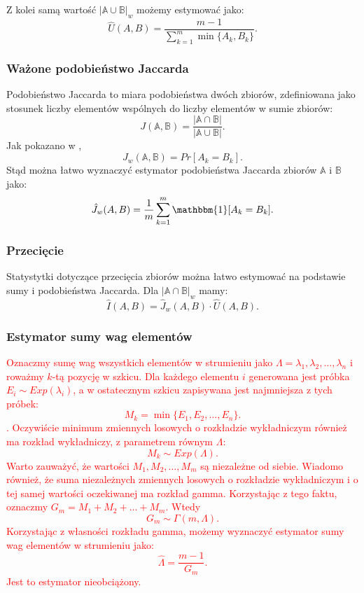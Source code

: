     Z kolei samą wartość $|\mathbb{A} \cup \mathbb{B}|_{w}$ możemy estymować jako:
    \[
        \hat{U}(A, B) = \frac{m - 1}{\sum\limits_{k = 1}^{m} \min{\{A_k, B_k\}}} .
    \]

    \subsubsection*{Ważone podobieństwo Jaccarda} 
    Podobieństwo Jaccarda to miara podobieństwa dwóch zbiorów, zdefiniowana jako stosunek liczby elementów wspólnych do liczby elementów w sumie zbiorów:
    \[
        J(\mathbb{A}, \mathbb{B}) = \frac{|\mathbb{A} \cap \mathbb{B}|}{|\mathbb{A} \cup \mathbb{B}|}.
    \]
    Jak pokazano w \cite{Lemiesz_2021}, 
    \[
        J_w(\mathbb{A}, \mathbb{B}) = Pr[A_k = B_k]. 
    \]
    Stąd można łatwo wyznaczyć estymator podobieństwa Jaccarda zbiorów $\mathbb{A}$ i $\mathbb{B}$ jako:
    \[
        \hat{J}_w(A, B) = \frac{1}{m} \sum\limits_{k = 1}^{m} \mathbbm{1}[A_k = B_k].  
    \]

    \subsubsection*{Przecięcie}
    Statystytki dotyczące przecięcia zbiorów można łatwo estymować na podstawie sumy i podobieństwa Jaccarda. Dla $|\mathbb{A} \cap \mathbb{B}|_{w}$ mamy:
    \[
        \hat{I}(A, B) = \hat{J}_w(A, B) \cdot \hat{U}(A, B).  
    \]
    \subsubsection*{Estymator sumy wag elementów}
    \label{sec:weight_sum_estimator}
    \textcolor{red}{Oznaczmy sumę wag wszystkich elementów w strumieniu jako $\Lambda = \lambda_1, \lambda_2, \dots, \lambda_n$ i roważmy $k$-tą pozycję w szkicu. Dla każdego elementu $i$ generowana jest próbka $E_i \sim Exp(\lambda_i)$, a w ostatecznym szkicu zapisywana jest najmniejsza z tych próbek: 
    \[
        M_k = \min{\{E_1, E_2, \dots, E_n\}}.
    \].
    Oczywiście minimum zmiennych losowych o rozkładzie wykładniczym również ma rozkład wykładniczy, z parametrem równym $\Lambda$:
    \[
        M_k \sim Exp(\Lambda).
    \]
    Warto zauważyć, że wartości $M_1, M_2, \dots, M_m$ są niezależne od siebie. Wiadomo również, że suma niezależnych zmiennych losowych o rozkładzie wykładniczym i o tej samej wartości oczekiwanej ma rozkład gamma. Korzystając z tego faktu, oznaczmy $G_m = M_1 + M_2 + \dots + M_m$. Wtedy 
    \[
        G_m \sim \Gamma(m, \Lambda).
    \]
    Korzystając z własności rozkładu gamma, możemy wyznaczyć estymator sumy wag elementów w strumieniu jako:
    \[
        \hat{\Lambda} = \frac{m - 1}{G_m}.
    \]
    Jest to estymator nieobciążony.
    }


